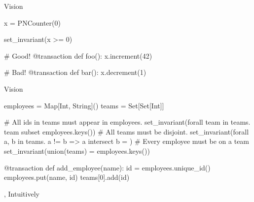 \documentclass[xcolor={dvipsnames,svgnames,table}]{beamer}
\begin{document}
\begin{frame}[fragile]{Vision}
  \begin{center}
    \begin{Python}[gobble=6]
      x = PNCounter(0)

      set_invariant(x >= 0)

      # Good!
      @transaction
      def foo():
        x.increment(42)

      # Bad!
      @transaction
      def bar():
        x.decrement(1)
    \end{Python}
  \end{center}
\end{frame}

\begin{frame}[fragile]{Vision}
  \begin{center}
    \begin{Python}[gobble=6]
      employees = Map[Int, String]()
      teams = Set[Set[Int]]

      # All ids in teams must appear in employees.
      set_invariant(forall team in teams.
        team subset employees.keys())
      # All teams must be disjoint.
      set_invariant(forall a, b in teams.
        a != b => a intersect b = {})
      # Every employee must be on a team
      set_invariant(union(teams) = employees.keys())

      @transaction
      def add_employee(name):
        id = employees.unique_id()
        employees.put(name, id)
        teams[0].add(id)
    \end{Python}
  \end{center}
\end{frame}

\begin{frame}{\iconfluence{}, Intuitively}
  \begin{center}
  \end{center}
\end{frame}
\end{document}

